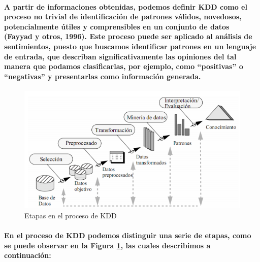 \paragraph{A partir de informaciones obtenidas, podemos definir KDD como el proceso no trivial de identificaci\'on de patrones v\'alidos, novedosos, potencialmente \'utiles y comprensibles en un conjunto de datos (Fayyad y otros, 1996). Este proceso puede ser aplicado al an\'alisis de sentimientos, puesto que buscamos identificar patrones en un lenguaje de entrada, que describan significativamente las opiniones del tal manera que podamos clasificarlas, por ejemplo, como ``positivas'' o ``negativas'' y presentarlas como informaci\'on generada.}

\begin{figure}[h]
\centering
\includegraphics[width=1 \textwidth]{etapaskdd.png}
\caption{Etapas en el proceso de KDD}
\label{etapaskdd}
\end{figure}

\paragraph{En el proceso de KDD podemos distinguir una serie de etapas, como se puede observar en la Figura \ref{etapaskdd}, las cuales describimos a continuaci\'on: }


